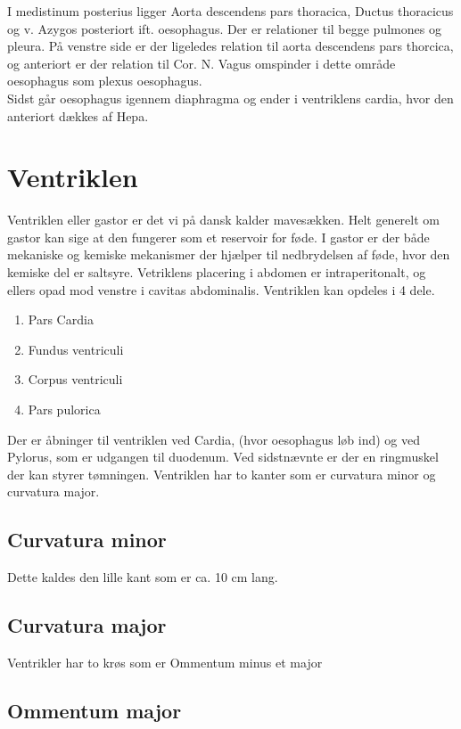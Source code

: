 	I medistinum posterius ligger Aorta descendens pars thoracica, Ductus thoracicus og v. Azygos posteriort ift. oesophagus. Der er relationer til begge pulmones og pleura. På venstre side er der ligeledes relation til aorta descendens pars thorcica, og anteriort er der relation til Cor. N. Vagus omspinder i dette område oesophagus som plexus oesophagus.\\
	
	Sidst går oesophagus igennem diaphragma og ender i ventriklens cardia, hvor den anteriort dækkes af Hepa.
	
	 
	 
	\section{Ventriklen}
	Ventriklen eller gastor er det vi på dansk kalder mavesækken. Helt generelt om gastor kan sige at den fungerer som et reservoir for føde. I gastor er der både mekaniske og kemiske mekanismer der hjælper til nedbrydelsen af føde, hvor den kemiske del er saltsyre. Vetriklens placering i abdomen er intraperitonalt, og ellers opad mod venstre i cavitas abdominalis. Ventriklen kan opdeles i 4 dele. 
	\begin{enumerate}
		\item Pars Cardia
		\item Fundus ventriculi
		\item Corpus ventriculi
		\item Pars pulorica
	\end{enumerate}
	Der er åbninger til ventriklen ved Cardia, (hvor oesophagus løb ind) og ved Pylorus, som er udgangen til duodenum. Ved sidstnævnte er der en ringmuskel der kan styrer tømningen. Ventriklen har to kanter som er curvatura minor og curvatura major. 
	
	\subsection{Curvatura minor}
	Dette kaldes den lille kant som er ca. 10 cm lang. 
	\subsection{Curvatura major}
	
	Ventrikler har to krøs som er Ommentum minus et major
	
	\subsection{Ommentum major}
	
